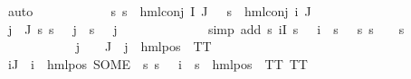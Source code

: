 \begin{isabellebody}
\ auto\isanewline
\ \ \ \ \ \ \ \ \ \ \isamarkupfalse%
\ {\isachardoublequoteopen}{\isasymforall}s{\isachardot}{\kern0pt}\ s\ {\isasymTurnstile}\ {\isacharparenleft}{\kern0pt}hml{\isacharunderscore}{\kern0pt}conj\ I\ J\ {\isasymPhi}{\isacharparenright}{\kern0pt}\ {\isasymlongleftrightarrow}\ s\ {\isasymTurnstile}\ {\isacharparenleft}{\kern0pt}hml{\isacharunderscore}{\kern0pt}conj\ {\isacharbraceleft}{\kern0pt}i{\isacharunderscore}{\kern0pt}{\isasymphi}{\isacharbraceright}{\kern0pt}\ J\ {\isasymPsi}{\isacharparenright}{\kern0pt}{\isachardoublequoteclose}\isanewline
\ \ \ \ \ \ \ \ \ \ \ \ \isamarkupfalse%
\ {\isacartoucheopen}{\isasymforall}j\ {\isasymin}\ J{\isachardot}{\kern0pt}\ {\isacharparenleft}{\kern0pt}{\isasymforall}s{\isachardot}{\kern0pt}\ {\isacharparenleft}{\kern0pt}s\ {\isasymTurnstile}\ {\isasymPhi}\ j{\isacharparenright}{\kern0pt}\ {\isasymlongleftrightarrow}\ {\isacharparenleft}{\kern0pt}s\ {\isasymTurnstile}\ {\isasymPsi}\ j{\isacharparenright}{\kern0pt}{\isacharparenright}{\kern0pt}{\isacartoucheclose}\isanewline
\ \ \ \ \ \ \ \ \ \ \ \ \isamarkupfalse%
\ {\isacharparenleft}{\kern0pt}simp\ add{\isacharcolon}{\kern0pt}\ {\isacartoucheopen}{\isasymforall}s{\isachardot}{\kern0pt}\ {\isacharparenleft}{\kern0pt}{\isasymforall}i{\isasymin}I{\isachardot}{\kern0pt}\ s\ {\isasymTurnstile}\ {\isasymPhi}\ i{\isacharparenright}{\kern0pt}\ {\isacharequal}{\kern0pt}\ {\isacharparenleft}{\kern0pt}s\ {\isasymTurnstile}\ {\isasymphi}{\isacharparenright}{\kern0pt}{\isacartoucheclose}\ {\isacartoucheopen}{\isasymforall}s{\isachardot}{\kern0pt}\ {\isacharparenleft}{\kern0pt}s\ {\isasymTurnstile}\ {\isasymphi}{\isacharparenright}{\kern0pt}\ {\isacharequal}{\kern0pt}\ {\isacharparenleft}{\kern0pt}s\ {\isasymTurnstile}\ {\isasympsi}{\isacharparenright}{\kern0pt}{\isacartoucheclose}{\isacharparenright}{\kern0pt}\isanewline
\ \ \ \ \ \ \ \ \ \ \isamarkupfalse%
\ {\isachardoublequoteopen}{\isasymforall}j\ {\isasymin}\ {\isasymPsi}\ {\isacharbackquote}{\kern0pt}\ J{\isachardot}{\kern0pt}\ {\isasymexists}{\isasymalpha}{\isachardot}{\kern0pt}\ j\ {\isacharequal}{\kern0pt}\ {\isacharparenleft}{\kern0pt}hml{\isacharunderscore}{\kern0pt}pos\ {\isasymalpha}\ TT{\isacharparenright}{\kern0pt}{\isachardoublequoteclose}\ \isanewline
\ \ \ \ \ \ \ \ \ \ \ \ \isamarkupfalse%
\ {\isacartoucheopen}{\isasymforall}i{\isasymin}J{\isachardot}{\kern0pt}\ {\isasymPsi}\ i\ {\isacharequal}{\kern0pt}\ hml{\isacharunderscore}{\kern0pt}pos\ {\isacharparenleft}{\kern0pt}SOME\ {\isasymalpha}{\isachardot}{\kern0pt}\ {\isasymforall}s{\isachardot}{\kern0pt}\ {\isacharparenleft}{\kern0pt}s\ {\isasymTurnstile}\ {\isasymPhi}\ i{\isacharparenright}{\kern0pt}\ {\isacharequal}{\kern0pt}\ {\isacharparenleft}{\kern0pt}s\ {\isasymTurnstile}\ hml{\isacharunderscore}{\kern0pt}pos\ {\isasymalpha}\ TT{\isacharparenright}{\kern0pt}{\isacharparenright}{\kern0pt}\ TT{\isacartoucheclose}\ \isamarkupfalse%

\end{isabellebody}
